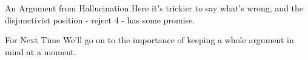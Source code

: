 \documentclass[
  17pt,
  letterpaper,
  ignorenonframetext,
  aspectratio=169,
  handout]{beamer}
\begin{document}
\begin{frame}{An Argument from Hallucination}
\protect\hypertarget{an-argument-from-hallucination-1}{}
Here it's trickier to say what's wrong, and the disjunctivist position -
reject 4 - has some promise.
\end{frame}

\begin{frame}{For Next Time}
\protect\hypertarget{for-next-time}{}
We'll go on to the importance of keeping a whole argument in mind at a
moment.
\end{frame}
\end{document}
